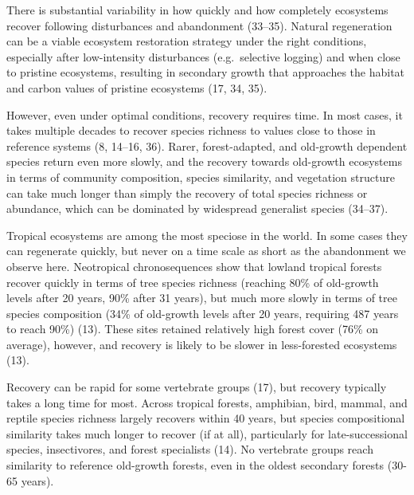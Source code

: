 \documentclass[9pt,twocolumn,twoside,]{pnas-new}
\begin{document}
There is substantial variability in how quickly and how completely
ecosystems recover following disturbances and abandonment (33--35).
Natural regeneration can be a viable ecosystem restoration strategy
under the right conditions, especially after low-intensity disturbances
(e.g.~selective logging) and when close to pristine ecosystems,
resulting in secondary growth that approaches the habitat and carbon
values of pristine ecosystems (17, 34, 35).

However, even under optimal conditions, recovery requires time. In most
cases, it takes multiple decades to recover species richness to values
close to those in reference systems (8, 14--16, 36). Rarer,
forest-adapted, and old-growth dependent species return even more
slowly, and the recovery towards old-growth ecosystems in terms of
community composition, species similarity, and vegetation structure can
take much longer than simply the recovery of total species richness or
abundance, which can be dominated by widespread generalist species
(34--37).

Tropical ecosystems are among the most speciose in the world. In some
cases they can regenerate quickly, but never on a time scale as short as
the abandonment we observe here. Neotropical chronosequences show that
lowland tropical forests recover quickly in terms of tree species
richness (reaching 80\% of old-growth levels after 20 years, 90\% after
31 years), but much more slowly in terms of tree species composition
(34\% of old-growth levels after 20 years, requiring 487 years to reach
90\%) (13). These sites retained relatively high forest cover (76\% on
average), however, and recovery is likely to be slower in less-forested
ecosystems (13).

Recovery can be rapid for some vertebrate groups (17), but recovery
typically takes a long time for most. Across tropical forests,
amphibian, bird, mammal, and reptile species richness largely recovers
within 40 years, but species compositional similarity takes much longer
to recover (if at all), particularly for late-successional species,
insectivores, and forest specialists (14). No vertebrate groups reach
similarity to reference old-growth forests, even in the oldest secondary
forests (30-65 years).
\end{document}
